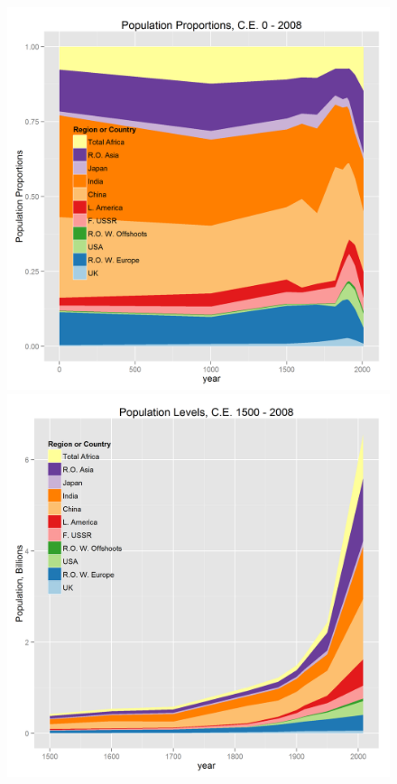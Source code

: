 \documentclass[final]{beamer}
\begin{document}
\begin{frame}
\begin{figure}[p!]
		\mbox{\includegraphics[height=0.43\textheight]{maddisonregpoppct}}
		\mbox{\includegraphics[height=0.43\textheight]{maddisonregpoplevels}}
\end{figure} %
\end{frame}
\end{document}
